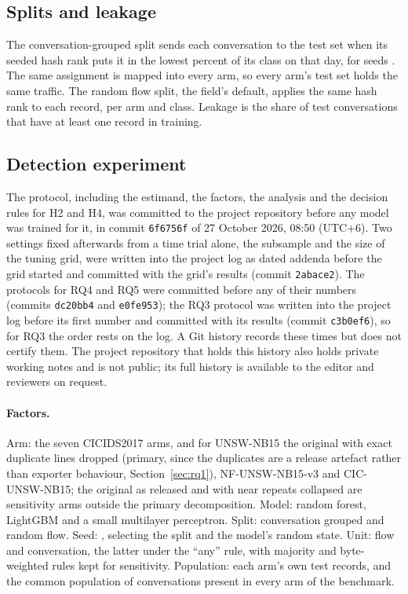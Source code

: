\documentclass[pdflatex,sn-mathphys-num]{sn-jnl}
\newcommand{\docnum}[1]{#1}
\newcommand{\cicids}{CICIDS2017}
\theoremstyle{thmstyleone}%
\theoremstyle{thmstylethree}%
\begin{document}
\subsection{Splits and leakage}

The conversation-grouped split sends each conversation to the test set when its seeded hash rank puts it in the lowest \SetTestPct{} percent of its class on that day, for seeds \SetSeeds{}. The same assignment is mapped into every arm, so every arm's test set holds the same traffic. The random flow split, the field's default, applies the same hash rank to each record, per arm and class. Leakage is the share of test conversations that have at least one record in training.

\subsection{Detection experiment}\label{sec:protocol}

The protocol, including the estimand, the factors, the analysis and the decision rules for H2 and H4, was committed to the project repository before any model was trained for it, in commit \docnum{\texttt{6f6756f}} of 27 October 2026, \docnum{08:50} (UTC\docnum{+6}). Two settings fixed afterwards from a time trial alone, the subsample and the size of the tuning grid, were written into the project log as dated addenda before the grid started and committed with the grid's results (commit \docnum{\texttt{2abace2}}). The protocols for RQ4 and RQ5 were committed before any of their numbers (commits \docnum{\texttt{dc20bb4}} and \docnum{\texttt{e0fe953}}); the RQ3 protocol was written into the project log before its first number and committed with its results (commit \docnum{\texttt{c3b0ef6}}), so for RQ3 the order rests on the log. A Git history records these times but does not certify them. The project repository that holds this history also holds private working notes and is not public; its full history is available to the editor and reviewers on request.

\paragraph{Factors.} Arm: the seven \cicids{} arms, and for UNSW-NB15 the original with exact duplicate lines dropped (primary, since the duplicates are a release artefact rather than exporter behaviour, Section~\ref{sec:rq1}), NF-UNSW-NB15-v3 and CIC-UNSW-NB15; the original as released and with near repeats collapsed are sensitivity arms outside the primary decomposition. Model: random forest, LightGBM and a small multilayer perceptron. Split: conversation grouped and random flow. Seed: \SetSeeds{}, selecting the split and the model's random state. Unit: flow and conversation, the latter under the ``any'' rule, with majority and byte-weighted rules kept for sensitivity. Population: each arm's own test records, and the common population of conversations present in every arm of the benchmark.
\end{document}
